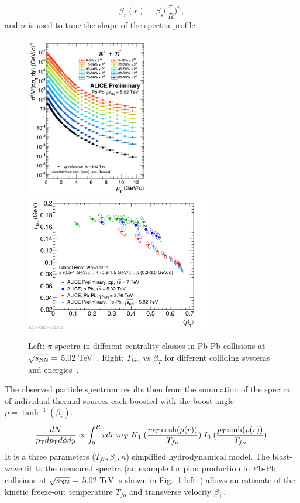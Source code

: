 \begin{equation}
\label{eq:Br}
\beta_r (r) = \beta_s \Big(\frac{r}{R}\Big )^n,
\end{equation}
and $n$ is used to tune the shape of the spectra profile.
\begin{figure}[!t]
  \centering
   \includegraphics[height=7cm]{FigCap1/PionsPbPb5TeV.png}
  \includegraphics[height=6cm]{FigCap1/BWfit_BetaTplot.pdf}
 \caption{Left: $\pi$ spectra in different centrality classes in Pb-Pb collisions at $\sqrt{s_{\rm NN}} = $ 5.02 TeV~\cite{Jacazio:2017dvy}. Right: $T_{kin}$ vs $\beta_T$ for different colliding systems and energies~\cite{Jacazio:2017dvy}.}
  \label{fig:BWfit_BetaTplot}
\end{figure}
The observed particle spectrum results then from the summation of the spectra of individual thermal sources each boosted with the boost angle $\rho = \tanh^{-1}(\beta_r)$.:
\begin{equation}
\label{eq:BlastWave}
\frac{dN}{p_{\rm T} dp_{\rm T} d\phi dy}\propto \int_{0}^{R} r dr\;  m_{T}\;  K_{1} \; (\frac{m_{T} \cosh(\rho(r))}{T_{fo}})\;  I_{0}\; (\frac{p_{\rm T} \sinh(\rho(r))}{T_{fo}}).
\end{equation}
It is a three parameters ($T_{fo}, \beta_s, n$) simplified hydrodynamical model.
The blast-wave fit to the measured spectra (an example for pion production in Pb-Pb collisions at $\sqrt{s_{\rm NN}} = $ 5.02 TeV is shown in Fig.~\ref{fig:BWfit_BetaTplot} left~\cite{Jacazio:2017dvy}) allows an estimate of the kinetic freeze-out temperature $T_{fo}$ and transverse velocity $\beta_{\perp}$.

